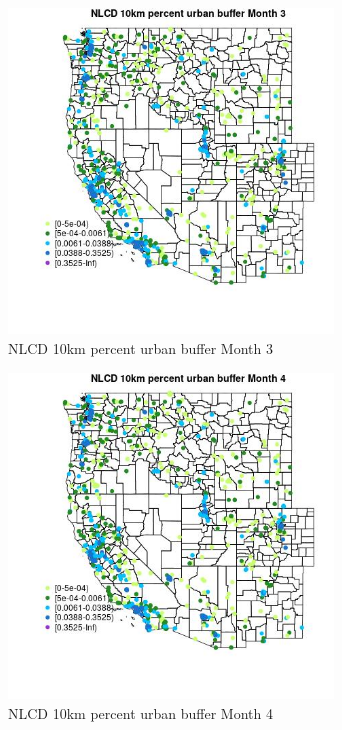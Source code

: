 \begin{figure} 
\centering  
\includegraphics[width=0.77\textwidth]{Code_Outputs/Report_ML_input_PM25_Step4_part_f_de_duplicated_aves_prioritize_24hr_obswNAs_MapObsMo3NLCD_10km_percent_urban_buffer.jpg} 
\caption{\label{fig:Report_ML_input_PM25_Step4_part_f_de_duplicated_aves_prioritize_24hr_obswNAsMapObsMo3NLCD_10km_percent_urban_buffer}NLCD 10km percent urban buffer Month 3} 
\end{figure} 
 

\begin{figure} 
\centering  
\includegraphics[width=0.77\textwidth]{Code_Outputs/Report_ML_input_PM25_Step4_part_f_de_duplicated_aves_prioritize_24hr_obswNAs_MapObsMo4NLCD_10km_percent_urban_buffer.jpg} 
\caption{\label{fig:Report_ML_input_PM25_Step4_part_f_de_duplicated_aves_prioritize_24hr_obswNAsMapObsMo4NLCD_10km_percent_urban_buffer}NLCD 10km percent urban buffer Month 4} 
\end{figure} 
 

